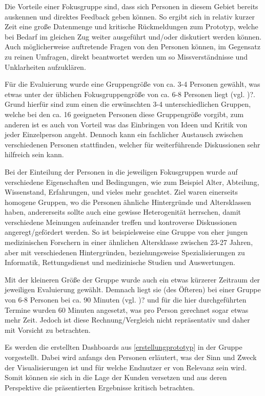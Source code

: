 Die Vorteile einer Fokusgruppe sind, dass sich Personen in diesem Gebiet bereits auskennen und direktes Feedback geben können. 
So ergibt sich in relativ kurzer Zeit eine große Datenmenge und kritische Rückmeldungen zum Prototyp, welche bei Bedarf im gleichen Zug weiter ausgeführt und/oder diskutiert werden können.
Auch möglicherweise auftretende Fragen von den Personen können, im Gegensatz zu reinen Umfragen, direkt beantwortet werden um so Missverständnisse und Unklarheiten aufzuklären.

Für die Evaluierung wurde eine Gruppengröße von ca. 3-4 Personen gewählt, was etwas unter der üblichen Fokusgruppengröße von ca. 6-8 Personen liegt (vgl. \cite{UsabilityinGermany.})?. 
Grund hierfür sind zum einen die erwünschten 3-4 unterschiedlichen Gruppen, welche bei den ca. 16 geeigneten Personen diese Gruppengröße vorgibt, zum anderen ist es auch von Vorteil was das Einbringen von Ideen und Kritik von jeder Einzelperson angeht.
Dennoch kann ein fachlicher Austausch zwischen verschiedenen Personen stattfinden, welcher für weiterführende Diskussionen sehr hilfreich sein kann. 

Bei der Einteilung der Personen in die jeweiligen Fokusgruppen wurde auf verschiedene Eigenschaften und Bedingungen, wie zum Beispiel Alter, Abteilung, Wissenstand, Erfahrungen, und vieles mehr geachtet. 
Ziel waren einerseits homogene Gruppen, wo die Personen ähnliche Hintergründe und Altersklassen haben, andererseits sollte auch eine gewisse Heterogenität herrschen, damit verschiedene Meinungen aufeinander treffen und kontroverse Diskussionen angeregt/gefördert werden.
So ist beispielsweise eine Gruppe von eher jungen medizinischen Forschern in einer ähnlichen Altersklasse zwischen 23-27 Jahren, aber mit verschiedenen Hintergründen, beziehungsweise Spezialisierungen zu Informatik, Rettungsdienst und medizinische Studien und Auswertungen.

Mit der kleineren Größe der Gruppe wurde auch ein etwas kürzerer Zeitraum der jeweiligen Evaluierung gewählt.
Demnach liegt sie (des Öfteren) bei einer Gruppe von 6-8 Personen bei ca. 90 Minuten (vgl. \cite{UsabilityinGermany.})? und für die hier durchgeführten Termine wurden 60 Minuten angesetzt, was pro Person gerechnet sogar etwas mehr Zeit.
Jedoch ist diese Rechnung/Vergleich nicht repräsentativ und daher mit Vorsicht zu betrachten.

Es werden die erstellten Dashboards aus \ref{erstellungprototyp} in der Gruppe vorgestellt. 
Dabei wird anfangs den Personen erläutert, was der Sinn und Zweck der Visualisierungen ist und für welche Endnutzer er von Relevanz sein wird.
Somit können sie sich in die Lage der Kunden versetzen und aus deren Perspektive die präsentierten Ergebnisse kritisch betrachten.

